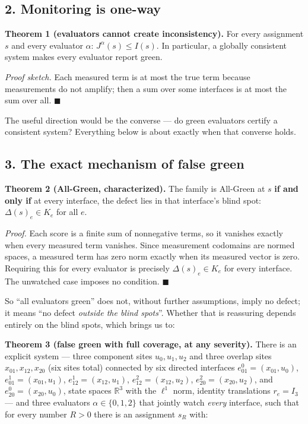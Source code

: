 \documentclass[
  11pt,
]{article}
\theoremstyle{plain}
\theoremstyle{definition}\newtheorem{definition}[theorem]{Definition}
\theoremstyle{remark}\newtheorem*{remark}{Remark}
\begin{document}
\subsection{2. Monitoring is one-way}\label{monitoring-is-one-way}

\textbf{Theorem 1 (evaluators cannot create inconsistency).} For every
assignment \(s\) and every evaluator \(\alpha\):
\(J^\alpha(s)\le I(s)\). In particular, a globally consistent system
makes every evaluator report green.

\emph{Proof sketch.} Each measured term is at most the true term because
measurements do not amplify; then a sum over some interfaces is at most
the sum over all. \(\blacksquare\)

The useful direction would be the converse --- do green evaluators
certify a consistent system? Everything below is about exactly when that
converse holds.

\subsection{3. The exact mechanism of false
green}\label{the-exact-mechanism-of-false-green}

\textbf{Theorem 2 (All-Green, characterized).} The family is All-Green
at \(s\) \textbf{if and only if} at every interface, the defect lies in
that interface's blind spot: \(\Delta(s)_e\in K_e\) for all \(e\).

\emph{Proof.} Each score is a finite sum of nonnegative terms, so it
vanishes exactly when every measured term vanishes. Since measurement
codomains are normed spaces, a measured term has zero norm exactly when
its measured vector is zero. Requiring this for every evaluator is
precisely \(\Delta(s)_e\in K_e\) for every interface. The unwatched case
imposes no condition. \(\blacksquare\)

So ``all evaluators green'' does not, without further assumptions, imply
no defect; it means ``no defect \emph{outside the blind spots}''.
Whether that is reassuring depends entirely on the blind spots, which
brings us to:

\textbf{Theorem 3 (false green with full coverage, at any severity).}
There is an explicit system --- three component sites \(u_0, u_1, u_2\)
and three overlap sites \(x_{01}, x_{12}, x_{20}\) (six sites total)
connected by six directed interfaces \(e_{01}^0 = (x_{01}, u_0)\),
\(e_{01}^1 = (x_{01}, u_1)\), \(e_{12}^1 = (x_{12}, u_1)\),
\(e_{12}^2 = (x_{12}, u_2)\), \(e_{20}^2 = (x_{20}, u_2)\), and
\(e_{20}^0 = (x_{20}, u_0)\), state spaces \(\mathbb R^3\) with the
\(\ell^1\) norm, identity translations \(r_e = I_3\) --- and three
evaluators \(\alpha \in \{0, 1, 2\}\) that jointly watch \emph{every}
interface, such that for every number \(R>0\) there is an assignment
\(s_R\) with:
\end{document}

